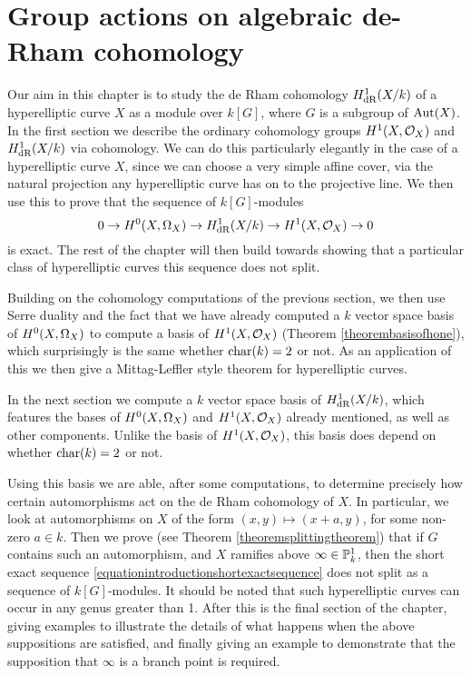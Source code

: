\chapter{Group actions on algebraic de-Rham cohomology} \label{Chapter:De-Rham cohomology}

Our aim in this chapter is to study the de Rham cohomology $H_{\text {dR}}^1(X/k)$ of a hyperelliptic curve $X$ as a module over $k[G]$, where $G$ is a subgroup of $\operatorname{Aut}(X)$.
In the first section we describe the ordinary cohomology groups $H^1(X,\mathcal{O}_X)$ and $H_{\text {dR}}^1(X/k)$ via \cech cohomology.
We can do this particularly elegantly in the case of a hyperelliptic curve $X$, since we can choose a very simple affine cover, via the natural projection any hyperelliptic curve has on to the projective line.
We then use this to prove that the sequence of $k[G]$-modules
    \begin{equation}\label{equationintroductionshortexactsequence}
    0 \rightarrow {H^0(X,\Omega_X)} \rightarrow H_{\text {dR}}^1(X/k) \rightarrow H^1(X,\mathcal{O}_X) \rightarrow 0
    \end{equation}
is exact.
The rest of the chapter will then build towards showing that a particular class of hyperelliptic curves this sequence does not split.

Building on the \cech cohomology computations of the previous section, we then use Serre duality and the fact that we have already computed a $k$ vector space basis of ${H^0(X,\Omega_X)}$ to compute a basis of $H^1(X,\mathcal{O}_X)$ (Theorem \ref{theorembasisofhone}), which surprisingly is the same whether $\operatorname{char}(k) = 2$ or not.
As an application of this we then give a Mittag-Leffler style theorem for hyperelliptic curves.

In the next section we compute a $k$ vector space basis of $H_{\text {dR}}^1(X/k)$, which features the bases of ${H^0(X,\Omega_X)}$ and $H^1(X,\mathcal{O}_X)$ already mentioned, as well as other components.
Unlike the basis of $H^1(X,\mathcal{O}_X)$, this basis does depend on whether $\operatorname{char}(k) = 2$ or not.

Using this basis we are able, after some computations, to determine precisely how certain automorphisms act on the de Rham cohomology of $X$.
In particular, we look at automorphisms on $X$ of the form $(x,y) \mapsto (x+a, y)$, for some non-zero $a \in k$.
Then we prove (see Theorem \ref{theoremsplittingtheorem}) that if $G$ contains such an automorphism, and $X$ ramifies above $\infty \in {\mathbb P}_k^1$, then the short exact sequence \eqref{equationintroductionshortexactsequence} does not split as a sequence of $k[G]$-modules.
It should be noted that such hyperelliptic curves can occur in any genus greater than 1.
After this is the final section of the chapter, giving examples to illustrate the details of what happens when the above suppositions are satisfied, and finally giving an example to demonstrate that the supposition that $\infty$ is a branch point is required.


